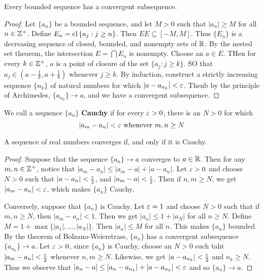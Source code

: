 \begin{theorem}\label{1.2.3}
    Every bounded sequence has a convergent subsequence.
\end{theorem}
\begin{proof}
    Let $\{a_n\}$ be a bounded sequence, and let $M>0$ such that  $|a_n| \geq
    M$ for all  $n \in \mathbb{Z}^+$. Define  $E_n=\operatorname{cl}{\{a_j : j \geq n\}}$. Then $EE
    \subseteq [-M,M]$. Thus $\{E_n\}$ is a decreasing sequence of closed,
    bounded, and nonempty sets of $\mathbb{R}$. By the nested set theorem, the
    intersection $E=\bigcap{E_n}$ is nonempty. Choose an $a \in E$. THen for
    every  $k \in \mathbb{Z}^+$,  $a$ is a point of closure of the set  $\{a_j : j \geq
    k\}$. SO that $a_j \in (a-\frac{1}{k}, a+\frac{1}{k})$ whenever $j \geq k$.
    By induction, construct a strictly increasing sequence  $\{n_k\}$ of natural
    numbers for which $|a-a_{n_k}|<\varepsilon$. Thenb by the principle of Archimedes,
    $\{a_{n_k}\} \xrightarrow{} a$, and we have a convergent subsequence.
\end{proof}

\begin{definition}
    We call a sequence $\{a_n\}$ \textbf{Cauchy} if for every $\varepsilon>0$, there is
    an  $N>0$ for which
    \begin{equation*}
        |a_m-a_n|<\varepsilon \text{ whenever } m,n \geq N
    \end{equation*}
\end{definition}

\begin{theorem}\label{1.2.4}
    A sequence of real numbers converges if, and only if it is Cauchy.
\end{theorem}
\begin{proof}
    Suppose that the sequence $\{a_n\} \xrightarrow{} a$ converges to $a \in
    \mathbb{R}$. Then for any  $m,n \in \mathbb{Z}^+$, notice that  $|a_m-a_n| \leq
    |a_m-a|+|a-a_n|$. Let  $\varepsilon>0$ and choose  $N>0$ such that
    $|a-a_n|<\frac{\varepsilon}{2}$, and $|a_m-a|<\frac{\varepsilon}{2}$. Then if $n,m \geq N$, we
    get  $|a_m-a_n|<\varepsilon$, which makes  $\{a_n\}$ Cauchy.

    Conversely, suppose that $\{a_n\}$ is Cauchy. Let $\varepsilon=1$ and choose  $N>0$
    such that if $m,n \geq N$, then $|a_m-a_n|<1$. Then we get $|a_n| \leq
    1+|a_N|$ for all  $n \geq N$. Define  $M=1+\max{\{|a_1|, \dots, |a_N|\}}$.
    Then $|a_n| \leq M$ for all  $n$. This makes  $\{a_n\}$ bounded. By the
    theorem of Bolzano-Weierstrass, $\{a_n\}$ has a convergent subsequence
    $\{a_{n_k}\} \xrightarrow{} a$. Let $\varepsilon>0$, since  $\{a_n\}$ is Cauchy,
    choose an $N>0$ such taht $|a_m-a_n|<\frac{\varepsilon}{2}$ whenever $n,m \geq N$.
    Likewise, we get  $|a-a_{n_k}|<\frac{\varepsilon}{2}$ and $n_k \geq N$. Thus we
    observe that  $|a_n-a| \leq |a_n-a_{n_k}|+|a-a_{n_k}|<\varepsilon$ and so $\{a_n\}
    \xrightarrow{} a$.
\end{proof}

